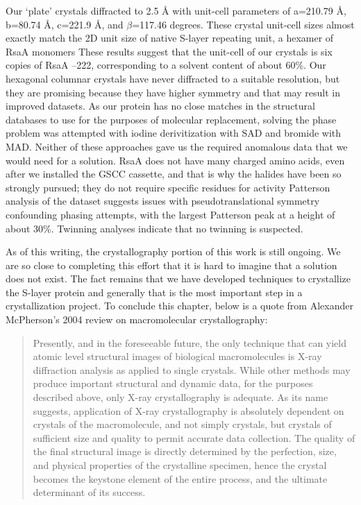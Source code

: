 Our `plate' crystals diffracted to 2.5 \AA{} with unit-cell parameters of
a=210.79 \AA, b=80.74 \AA, c=221.9 \AA,  and $\beta$=117.46 degrees. These
crystal unit-cell sizes almost exactly match the 2D unit size of native
\ac{S-layer} repeating unit, a hexamer of RsaA monomers
These results suggest that the unit-cell of our crystals is six copies of RsaA
--222, corresponding to a solvent content of  about 60\%. Our hexagonal
columnar crystals have never diffracted to a suitable resolution, but they are
promising because they have higher symmetry and that may result in improved
datasets. As our protein has no close matches in the structural databases to use
for the purposes of molecular replacement, solving the phase problem was
attempted with iodine derivitization with \ac{SAD} and bromide with \ac{MAD}.
Neither of these approaches gave us the required anomalous data that we would
need for a solution.   RsaA does not have many charged amino acids, even after
we installed the GSCC cassette, and that is why the halides have been so
strongly pursued; they do not require specific residues for
activity Patterson analysis of the dataset suggests issues with
pseudotranslational symmetry confounding phasing attempts, with the largest
Patterson peak at a height of about 30\%.  Twinning analyses indicate that no twinning is suspected.

As of this writing, the crystallography portion of this work is still ongoing. We are so close to completing this effort that it is hard to imagine that a solution does not exist.  The fact remains that we have developed techniques to crystallize the \ac{S-layer} protein and generally that is the most important step in a crystallization project. To conclude this chapter, below is a quote from Alexander McPherson's 2004 review on macromolecular crystallography:

\begin{quote}
 Presently, and in the foreseeable future, the only technique that can yield atomic level structural images of biological macromolecules is X-ray diffraction analysis as applied to single crystals. While other methods may produce important structural and dynamic data, for the purposes described above, only X-ray crystallography is adequate. As its name suggests, application of X-ray crystallography is absolutely dependent on crystals of the macromolecule, and not simply crystals, but crystals of sufficient size and quality to permit accurate data collection. The quality of the final structural image is directly determined by the perfection, size, and physical properties of the crystalline specimen, hence the crystal becomes the keystone element of the entire process, and the ultimate determinant of its success.
\end{quote}